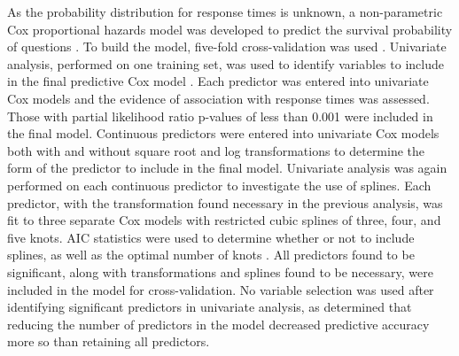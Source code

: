 \documentclass[preprint]{elsarticle}\usepackage[]{graphicx}\usepackage[]{color}
\begin{document}
As the probability distribution for response times is unknown, a non-parametric Cox proportional hazards model was developed to predict the survival probability of questions \cite{Moore2010}. To build the model, five-fold cross-validation was used \cite{Rodriguez2010}. Univariate analysis, performed on one training set, was used to identify variables to include in the final predictive Cox model \cite{Hammermeister1979}. Each predictor was entered into univariate Cox models and the evidence of association with response times was assessed. Those with partial likelihood ratio p-values of less than 0.001 were included in the final model.  Continuous predictors were entered into univariate Cox models both with and without square root and log transformations to determine the form of the predictor to include in the final model. Univariate analysis was again performed on each continuous predictor to investigate the use of splines. Each predictor, with the transformation found necessary in the previous analysis, was fit to three separate Cox models with restricted cubic splines of three, four, and five knots. AIC statistics were used to determine whether or not to include splines, as well as the optimal number of knots \cite{Harrell2015}. All predictors found to be significant, along with transformations and splines found to be necessary, were included in the model for cross-validation. No variable selection was used after identifying significant predictors in univariate analysis, as \cite{Harrell2015} determined that reducing the number of predictors in the model decreased predictive accuracy more so than retaining all predictors. 
\end{document}
